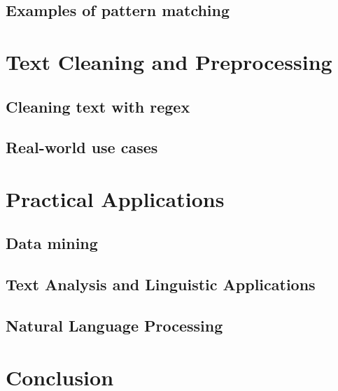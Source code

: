 \documentclass{article}
\begin{document}
\subsection{Examples of pattern matching}

\section{Text Cleaning and Preprocessing}
\subsection{Cleaning text with regex}
\subsection{Real-world use cases}

\section{Practical Applications}
\subsection{Data mining}
\subsection{Text Analysis and Linguistic Applications}
\subsection{Natural Language Processing}

\section{Conclusion}
\end{document}
